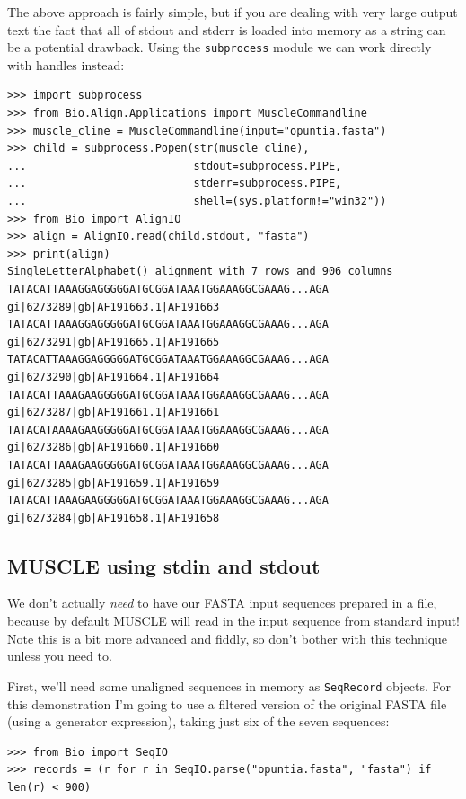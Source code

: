 \documentclass{report}
\begin{document}
The above approach is fairly simple, but if you are dealing with very large output
text the fact that all of stdout and stderr is loaded into memory as a string can
be a potential drawback. Using the \verb|subprocess| module we can work directly
with handles instead:

\begin{verbatim}
>>> import subprocess
>>> from Bio.Align.Applications import MuscleCommandline
>>> muscle_cline = MuscleCommandline(input="opuntia.fasta")
>>> child = subprocess.Popen(str(muscle_cline),
...                          stdout=subprocess.PIPE,
...                          stderr=subprocess.PIPE,
...                          shell=(sys.platform!="win32"))
>>> from Bio import AlignIO
>>> align = AlignIO.read(child.stdout, "fasta")
>>> print(align)
SingleLetterAlphabet() alignment with 7 rows and 906 columns
TATACATTAAAGGAGGGGGATGCGGATAAATGGAAAGGCGAAAG...AGA gi|6273289|gb|AF191663.1|AF191663
TATACATTAAAGGAGGGGGATGCGGATAAATGGAAAGGCGAAAG...AGA gi|6273291|gb|AF191665.1|AF191665
TATACATTAAAGGAGGGGGATGCGGATAAATGGAAAGGCGAAAG...AGA gi|6273290|gb|AF191664.1|AF191664
TATACATTAAAGAAGGGGGATGCGGATAAATGGAAAGGCGAAAG...AGA gi|6273287|gb|AF191661.1|AF191661
TATACATAAAAGAAGGGGGATGCGGATAAATGGAAAGGCGAAAG...AGA gi|6273286|gb|AF191660.1|AF191660
TATACATTAAAGAAGGGGGATGCGGATAAATGGAAAGGCGAAAG...AGA gi|6273285|gb|AF191659.1|AF191659
TATACATTAAAGAAGGGGGATGCGGATAAATGGAAAGGCGAAAG...AGA gi|6273284|gb|AF191658.1|AF191658
\end{verbatim}

\subsection{MUSCLE using stdin and stdout}

We don't actually \emph{need} to have our FASTA input sequences prepared in a file,
because by default MUSCLE will read in the input sequence from standard input!
Note this is a bit more advanced and fiddly, so don't bother with this technique
unless you need to.

First, we'll need some unaligned sequences in memory as \verb|SeqRecord| objects.
For this demonstration I'm going to use a filtered version of the original FASTA
file (using a generator expression), taking just six of the seven sequences:

\begin{verbatim}
>>> from Bio import SeqIO
>>> records = (r for r in SeqIO.parse("opuntia.fasta", "fasta") if len(r) < 900)
\end{verbatim}
\end{document}
